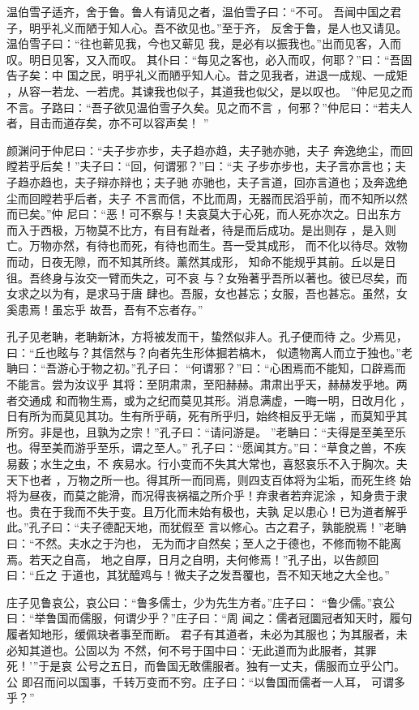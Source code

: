 \documentclass[12pt,UTF8]{ctexbook}
\begin{document}
温伯雪子适齐，舍于鲁。鲁人有请见之者，温伯雪子曰：“不可。 吾闻中国之君子，明乎礼义而陋于知人心。吾不欲见也。”至于齐， 反舍于鲁，是人也又请见。温伯雪子曰：“往也蕲见我，今也又蕲见 我，是必有以振我也。”出而见客，入而叹。明日见客，又入而叹。 其仆曰：“每见之客也，必入而叹，何耶？”曰：“吾固告子矣：中 国之民，明乎礼义而陋乎知人心。昔之见我者，进退一成规、一成矩 ，从容一若龙、一若虎。其谏我也似子，其道我也似父，是以叹也。 ”仲尼见之而不言。子路曰：“吾子欲见温伯雪子久矣。见之而不言 ，何邪？”仲尼曰：“若夫人者，目击而道存矣，亦不可以容声矣！ ”

颜渊问于仲尼曰：“夫子步亦步，夫子趋亦趋，夫子驰亦驰，夫子 奔逸绝尘，而回瞠若乎后矣！”夫子曰：“回，何谓邪？”曰：“夫 子步亦步也，夫子言亦言也；夫子趋亦趋也，夫子辩亦辩也；夫子驰 亦驰也，夫子言道，回亦言道也；及奔逸绝尘而回瞠若乎后者，夫子 不言而信，不比而周，无器而民滔乎前，而不知所以然而已矣。”仲 尼曰：“恶！可不察与！夫哀莫大于心死，而人死亦次之。日出东方 而入于西极，万物莫不比方，有目有趾者，待是而后成功。是出则存 ，是入则亡。万物亦然，有待也而死，有待也而生。吾一受其成形， 而不化以待尽。效物而动，日夜无隙，而不知其所终。薰然其成形， 知命不能规乎其前。丘以是日徂。吾终身与汝交一臂而失之，可不哀 与？女殆著乎吾所以著也。彼已尽矣，而女求之以为有，是求马于唐 肆也。吾服，女也甚忘；女服，吾也甚忘。虽然，女奚患焉！虽忘乎 故吾，吾有不忘者存。”

孔子见老聃，老聃新沐，方将被发而干，蛰然似非人。孔子便而待 之。少焉见，曰：“丘也眩与？其信然与？向者先生形体掘若槁木， 似遗物离人而立于独也。”老聃曰：“吾游心于物之初。”孔子曰： “何谓邪？”曰：“心困焉而不能知，口辟焉而不能言。尝为汝议乎 其将：至阴肃肃，至阳赫赫。肃肃出乎天，赫赫发乎地。两者交通成 和而物生焉，或为之纪而莫见其形。消息满虚，一晦一明，日改月化 ，日有所为而莫见其功。生有所乎萌，死有所乎归，始终相反乎无端 ，而莫知乎其所穷。非是也，且孰为之宗！”孔子曰：“请问游是。 ”老聃曰：“夫得是至美至乐也。得至美而游乎至乐，谓之至人。” 孔子曰：“愿闻其方。”曰：“草食之兽，不疾易薮；水生之虫，不 疾易水。行小变而不失其大常也，喜怒哀乐不入于胸次。夫天下也者 ，万物之所一也。得其所一而同焉，则四支百体将为尘垢，而死生终 始将为昼夜，而莫之能滑，而况得丧祸福之所介乎！弃隶者若弃泥涂 ，知身贵于隶也。贵在于我而不失于变。且万化而未始有极也，夫孰 足以患心！已为道者解乎此。”孔子曰：“夫子德配天地，而犹假至 言以修心。古之君子，孰能脱焉！”老聃曰：“不然。夫水之于汋也， 无为而才自然矣；至人之于德也，不修而物不能离焉。若天之自高， 地之自厚，日月之自明，夫何修焉！”孔子出，以告颜回曰：“丘之 于道也，其犹醯鸡与！微夫子之发吾覆也，吾不知天地之大全也。”

庄子见鲁哀公，哀公曰：“鲁多儒士，少为先生方者。”庄子曰： “鲁少儒。”哀公曰：“举鲁国而儒服，何谓少乎？”庄子曰：“周 闻之：儒者冠圜冠者知天时，履句履者知地形，缓佩玦者事至而断。 君子有其道者，未必为其服也；为其服者，未必知其道也。公固以为 不然，何不号于国中曰：‘无此道而为此服者，其罪死！’”于是哀 公号之五日，而鲁国无敢儒服者。独有一丈夫，儒服而立乎公门。公 即召而问以国事，千转万变而不穷。庄子曰：“以鲁国而儒者一人耳， 可谓多乎？”
\end{document}
